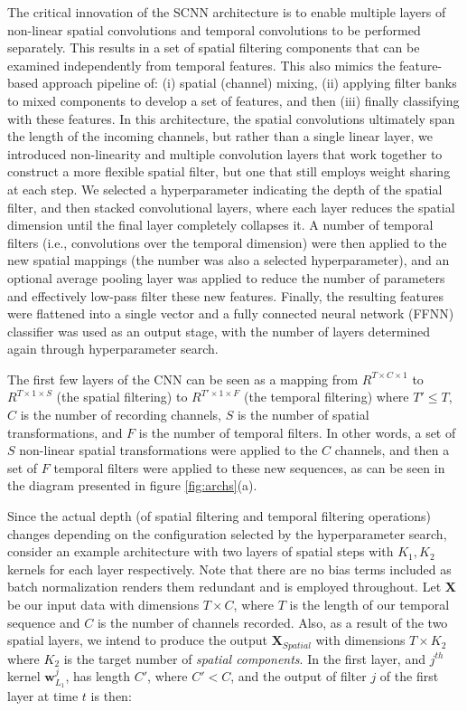 \documentclass[fleqn,10pt]{wlscirep}
\begin{document}
The critical innovation of the SCNN architecture is to enable multiple layers of non-linear spatial convolutions and temporal convolutions to be performed separately. This results in a set of spatial filtering components that can be examined independently from temporal features. This also mimics the feature-based approach pipeline of: (i) spatial (channel) mixing, (ii) applying filter banks to mixed components to develop a set of features, and then (iii) finally classifying with these features. In this architecture, the spatial convolutions ultimately span the length of the incoming channels, but rather than a single linear layer, we introduced non-linearity and multiple convolution layers that work together to construct a more flexible spatial filter, but one that still employs weight sharing at each step. We selected a hyperparameter indicating the depth of the spatial filter, and then stacked convolutional layers, where each layer reduces the spatial dimension until the final layer completely collapses it. A number of temporal filters (i.e., convolutions over the temporal dimension) were then applied to the new spatial mappings (the number was also a selected hyperparameter), and an optional average pooling layer was applied to reduce the number of parameters and effectively low-pass filter these new features. Finally, the resulting features were flattened into a single vector and a fully connected neural network (FFNN) classifier was used as an output stage, with the number of layers determined again through hyperparameter search.

The first few layers of the CNN can be seen as a mapping from $R^{T \times C \times 1}$ to $R^{T \times 1 \times S}$ (the spatial filtering) to $R^{T' \times 1 \times F }$ (the temporal filtering) where $T' \leq T$, $C$ is the number of recording channels, $S$ is the number of spatial transformations, and $F$ is the number of temporal filters. In other words, a set of $S$ non-linear spatial transformations were applied to the $C$ channels, and then a set of $F$ temporal filters were applied to these new sequences, as can be seen in the diagram presented in figure \ref{fig:archs}(a).

Since the actual depth (of spatial filtering and temporal filtering operations) changes depending on the configuration selected by the hyperparameter search, consider an example architecture with two layers of spatial steps with $K_1, K_2$ kernels for each layer respectively. Note that there are no bias terms included as batch normalization \cite{Szegedy2015} renders them redundant and is employed throughout. Let $\boldsymbol{X}$ be our input data with dimensions $T \times C$, where $T$ is the length of our temporal sequence and $C$ is the number of channels recorded. Also, as a result of the two spatial layers, we intend to produce the output $\boldsymbol{X}_{Spatial}$ with dimensions $T \times K_2$ where $K_2$ is the target number of {\em spatial components}. In the first layer, and $j^{th}$ kernel $\boldsymbol{w}_{L_1}^j$, has length $C'$, where $C' < C$, and the output of filter $j$ of the first layer at time $t$ is then:
\end{document}
